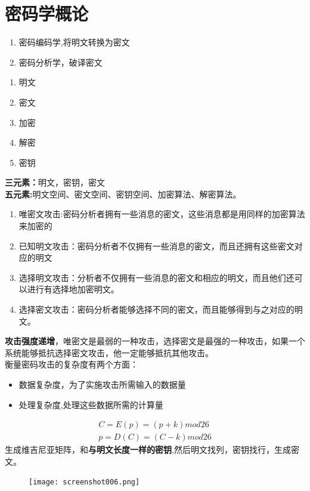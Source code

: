 \chapter{密码学概论}
\begin{enumerate}
	\item 密码编码学,将明文转换为密文
	\item 密码分析学，破译密文
\end{enumerate}

\begin{enumerate}
	\item 明文
	\item 密文
	\item 加密
	\item 解密
	\item 密钥
\end{enumerate}
\textbf{三元素：}明文，密钥，密文\\
\textbf{五元素:}明文空间、密文空间、密钥空间、加密算法、解密算法。

\begin{enumerate}
	\item 唯密文攻击:密码分析者拥有一些消息的密文，这些消息都是用同样的加密算法来加密的
	\item 已知明文攻击：密码分析者不仅拥有一些消息的密文，而且还拥有这些密文对应的明文
	\item 选择明文攻击：分析者不仅拥有一些消息的密文和相应的明文，而且他们还可以进行有选择地加密明文。
	\item 选择密文攻击：密码分析者能够选择不同的密文，而且能够得到与之对应的明文。
\end{enumerate}

\indent \textbf{攻击强度递增}，唯密文是最弱的一种攻击，选择密文是最强的一种攻击，如果一个系统能够抵抗选择密文攻击，他一定能够抵抗其他攻击。\\

衡量密码攻击的复杂度有两个方面：
\begin{itemize}
	\item 数据复杂度，为了实施攻击所需输入的数据量
	\item 处理复杂度,处理这些数据所需的计算量
\end{itemize}


\begin{gather}
C=E(p)=(p+k) mod 26 \\ 
p=D(C)=(C-k) mod 26
\end{gather}
生成维吉尼亚矩阵，和\textbf{与明文长度一样的密钥},然后明文找列，密钥找行，生成密文。
\begin{figure}[H]
	\centering
	\texttt{[image: screenshot006.png]}
\end{figure}

